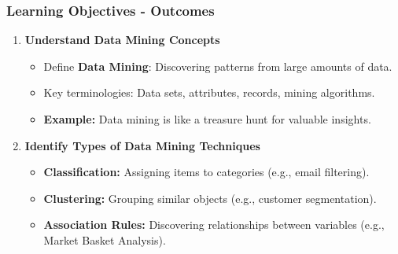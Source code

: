 \documentclass[aspectratio=169]{beamer}
\begin{document}
\begin{frame}[fragile]
    \frametitle{Learning Objectives - Outcomes}
    \begin{enumerate}
        \item \textbf{Understand Data Mining Concepts}
        \begin{itemize}
            \item Define \textbf{Data Mining}: Discovering patterns from large amounts of data.
            \item Key terminologies: Data sets, attributes, records, mining algorithms.
            \item \textbf{Example:} Data mining is like a treasure hunt for valuable insights.
        \end{itemize}
        
        \item \textbf{Identify Types of Data Mining Techniques}
        \begin{itemize}
            \item \textbf{Classification:} Assigning items to categories (e.g., email filtering).
            \item \textbf{Clustering:} Grouping similar objects (e.g., customer segmentation).
            \item \textbf{Association Rules:} Discovering relationships between variables (e.g., Market Basket Analysis).
        \end{itemize}
    \end{enumerate}
\end{frame}
\end{document}
